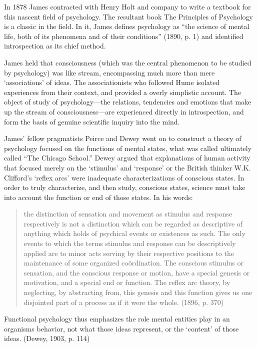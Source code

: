In 1878 James contracted with Henry Holt and company to write a textbook for this nascent field of psychology. The resultant book The Principles of Psychology is a classic in the field. In it, James defines psychology as ``the science of mental life, both of its phenomena and of their conditions'' (1890, p. 1) and identified introspection as its chief method.

James held that consciousness (which was the central phenomenon to be studied by psychology) was like stream, encompassing much more than mere `associations' of ideas. The associationists who followed Hume isolated experiences from their context, and provided a overly simplistic account. The object of study of psychology---the relations, tendencies and emotions that make up the stream of consciousness---are experienced directly in introspection, and form the basis of genuine scientific inquiry into the mind.

James' fellow pragmatists Peirce and Dewey went on to construct a theory of psychology focused on the functions of mental states, what was called ultimately called ``The Chicago School.'' Dewey argued that explanations of human activity that focused merely on the `stimulus' and `response' or the British thinker W.K. Clifford's `reflex arcs' were inadequate characterizations of conscious states. In order to truly characterize, and then study, conscious states, science must take into account the function or end of those states. In his words:

\begin{quote}

the distinction of sensation and movement as stimulus and response respectively is not a distinction which can be regarded as descriptive of anything which holds of psychical events or existences as such. The only events to which the terms stimulus and response can be descriptively applied are to minor acts serving by their respective positions to the maintenance of some organized coördination. The conscious stimulus or sensation, and the conscious response or motion, have a special genesis or motivation, and a special end or function. The reflex arc theory, by neglecting, by abstracting from, this genesis and this function gives us one disjointed part of a process as if it were the whole. (1896, p. 370)
\end{quote}

Functional psychology thus emphasizes the role mental entities play in an organisms behavior, not what those ideas represent, or the `content' of those ideas. (Dewey, 1903, p. 114)

